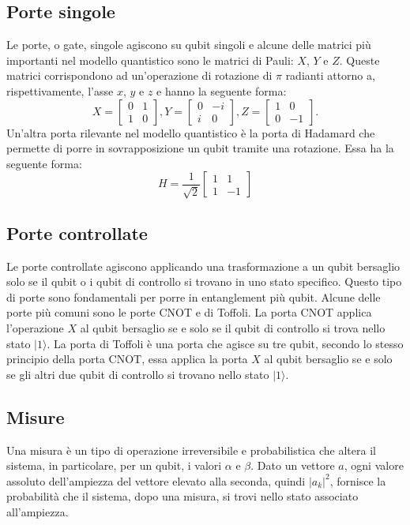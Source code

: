 \subsection{Porte singole}
Le porte, o gate, singole agiscono su qubit singoli e alcune delle matrici più importanti nel modello quantistico sono le matrici di Pauli: $X$, $Y$ e $Z$. Queste matrici corrispondono ad un'operazione di rotazione di $\pi$ radianti attorno a, rispettivamente, l'asse $x$, $y$ e $z$ e hanno la seguente forma:
\begin{equation}
  X =
  \begin{bmatrix}
    0 & 1 \\
    1 & 0
  \end{bmatrix},
  Y =
  \begin{bmatrix}
    0 & -i \\
    i & 0
  \end{bmatrix},
  Z =
  \begin{bmatrix}
    1 & 0  \\
    0 & -1
  \end{bmatrix}.
\end{equation}
Un'altra porta rilevante nel modello quantistico è la porta di Hadamard che permette di porre in sovrapposizione un qubit tramite una rotazione. Essa ha la seguente forma:
\begin{equation}
  H = \frac{1}{\sqrt{2}}\begin{bmatrix}
    1 & 1  \\
    1 & -1
  \end{bmatrix}
\end{equation}
\subsection{Porte controllate}
Le porte controllate agiscono applicando una trasformazione a un qubit bersaglio solo se il qubit o i qubit di controllo si trovano in uno stato specifico. Questo tipo di porte sono fondamentali per porre in entanglement più qubit. Alcune delle porte più comuni sono le porte CNOT e di Toffoli. La porta CNOT applica l'operazione $X$ al qubit bersaglio se e solo se il qubit di controllo si trova nello stato $|1\rangle$. La porta di Toffoli è una porta che agisce su tre qubit, secondo lo stesso principio della porta CNOT, essa applica la porta $X$ al qubit bersaglio se e solo se gli altri due qubit di controllo si trovano nello stato $|1\rangle$.
\subsection{Misure}
Una misura è un tipo di operazione irreversibile e probabilistica che altera il sistema, in particolare, per un qubit, i valori $\alpha$ e $\beta$.
Dato un vettore $a$, ogni valore assoluto dell'ampiezza del vettore elevato alla seconda, quindi $|a_k|^2$, fornisce la probabilità che il sistema, dopo una misura, si trovi nello stato associato all'ampiezza.

